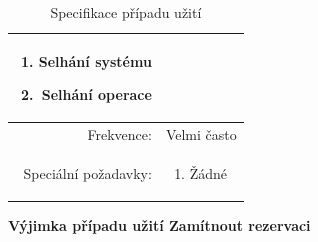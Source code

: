 \documentclass[a4paper,10pt]{article}
\begin{document}
\begin{center}
\begin{table}[ht!]
{\begin{tabular}{| r | p{12cm} |}
\begin{minipage}[t]{0.75\textwidth}
    	\begin{enumerate}[nosep,after=\strut]
    		\item Selhání systému
    		\item Selhání operace
    	\end{enumerate}
  	\end{minipage} \\
    \hline
    Frekvence: & Velmi často \\
    \hline
    Speciální požadavky: & 
    \begin{minipage}[t]{0.75\textwidth}
    	\begin{enumerate}[nosep,after=\strut]
    		\item Žádné
    	\end{enumerate}
  	\end{minipage} \\
    \hline

\end{tabular}}
\caption{Specifikace případu užití }
\label{table:5}
\end{table}
\end{center}

\newpage
\textbf{Výjimka případu užití \textbf{Zamítnout rezervaci}}
\end{document}
